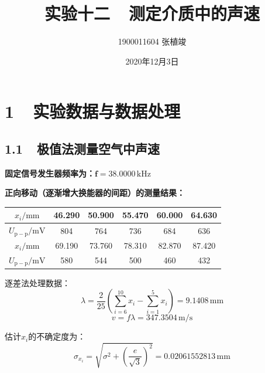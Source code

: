 \documentclass[a4paper,fontset=windows]{ctexart}
\begin{document}
\Large

    \title{\huge\textbf{实验十二\ \ 测定介质中的声速}}
    \author{\LARGE 1900011604 张植竣}
    \date{\LARGE 2020年12月3日}

    \maketitle

    \section*{ 1\ \ 实验数据与数据处理}
    \bigskip

    \subsection*{ 1.1\ \ 极值法测量空气中声速}

    \textbf{固定信号发生器频率为：}$\boldsymbol{f = 38.0000\,\mathrm{kHz}}$

    \textbf{正向移动（逐渐增大换能器的间距）的测量结果：}

    \vspace{0.5em}\begin{table}[ht!]\Large
        \begin{center}
            \begin{tabular}{ |c|c|c|c|c|c| }
                \hline
                $x_i/\mathrm{mm}$ & 46.290 & 50.900 & 55.470 & 60.000 & 64.630 \\
                \hline
                $U_\mathrm{p-p}/\mathrm{mV}$ & 804 & 764 & 736 & 684 & 636 \\
                \hline
                $x_i/\mathrm{mm}$ & 69.190 & 73.760 & 78.310 & 82.870 & 87.420 \\
                \hline
                $U_\mathrm{p-p}/\mathrm{mV}$ & 580 & 544 & 500 & 460 & 432 \\
                \hline
            \end{tabular}
        \end{center}
    \end{table}\vspace{-0.5em}

    逐差法处理数据：
    \[
    \lambda = \frac{2}{25}\left(\sum\limits_{i=6}^{10}x_i - \sum\limits_{i=1}^{5}x_i\right) = 9.1408\,\mathrm{mm}
    \]
    \[
    v = f\lambda = 347.3504\,\mathrm{m/s}
    \]

    估计$x_i$的不确定度为：
    \[
    \sigma_{x_i} = \sqrt{\sigma^2 + \left(\frac{e}{\sqrt{3}}\right)^2} = 0.02061552813\,\mathrm{mm}
    \]
\end{document}
